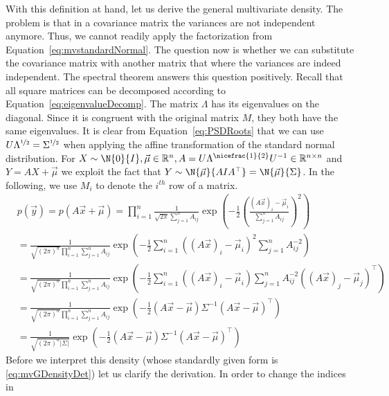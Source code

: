 With this definition at hand, let us derive the general multivariate density. The problem is that in a covariance matrix the variances are not independent anymore.
Thus, we cannot readily apply the factorization from Equation~\eqref{eq:mvstandardNormal}. The question now is whether we can substitute the covariance matrix with
another matrix that where the variances are indeed independent. The spectral theorem answers this question positively. Recall that all square matrices can be decomposed
according to Equation~\eqref{eq:eigenvalueDecomp}. The matrix $ \Lambda $ has its eigenvalues on the diagonal. Since it is congruent with the original matrix $ M $,
they both have the same eigenvalues. It is clear from Equation~\eqref{eq:PSDRoots} that we can use $ U \Lambda^{\nicefrac{1}{2}} = \Sigma^{\nicefrac{1}{2}} $ when applying the affine transformation of the standard normal distribution.
For $ X \sim \N{0}{I}, \vec{\mu} \in \mathbb{R}^{n}, A = U\Lambda^{\nicefrac{1}{2}}U^{-1} \in \mathbb{R}^{n\times n} $ and $ Y = AX + \vec{\mu} $ we exploit
the fact that $ Y \sim \N{\vec{\mu}}{AIA^{\top}} = \N{\vec{\mu}}{\Sigma} $. In the following, we use $ M_{i} $ to denote the $ i^{th} $ row of a matrix.
\begin{align}
&p(\vec{y}) 
= p(A\vec{x} + \vec{\mu}) = \prod_{i=1}^{n} \frac{1}{\sqrt{2\pi} \sum_{j=1}^{n}A_{ij}} \exp \left(-\frac{1}{2} \left( \frac{(A\vec{x})_{i} - \vec{\mu}_{i}}{\sum_{j=1}^{n}A_{ij}} \right)^{2}  \right) \\
&= \frac{1}{\sqrt{\left( 2\pi \right)^{n}} \prod_{i=1}^{n}\sum_{j=1}^{n}A_{ij}}
\exp \left(-\frac{1}{2} \sum_{i=1}^{n} \left( (A\vec{x})_{i} - \vec{\mu}_{i} \right)^{2} \sum_{j=1}^{n}A_{ij}^{-2} \right) \\
&= \frac{1}{\sqrt{\left( 2\pi \right)^{n}} \prod_{i=1}^{n}\sum_{j=1}^{n}A_{ij}}
\exp \left(-\frac{1}{2} \sum_{i=1}^{n} \left( ( A\vec{x} )_{i} - \vec{\mu}_{i}\right) \sum_{j=1}^{n} A_{ij}^{-2} \left((A\vec{x})_{j} - \vec{\mu}_{j} \right)^{\top} \right) 
\label{eq:quadraticForm} \\
&= \frac{1}{\sqrt{\left( 2\pi \right)^{n}} \prod_{i=1}^{n}\sum_{j=1}^{n}A_{ij}}
\exp \left(-\frac{1}{2} \left( A\vec{x} - \vec{\mu}\right) \Sigma^{-1} \left(A\vec{x} - \vec{\mu} \right)^{\top} \right) \\
&= \frac{1}{\sqrt{\left( 2\pi \right)^{n} |\Sigma|}}
\exp \left(-\frac{1}{2} \left( A\vec{x} - \vec{\mu}\right) \Sigma^{-1} \left(A\vec{x} - \vec{\mu} \right)^{\top} \right) \label{eq:mvGDensityDet}
\end{align}
Before we interpret this density (whose standardly given form is \eqref{eq:mvGDensityDet}) let us clarify the derivation. In order to change the indices in
